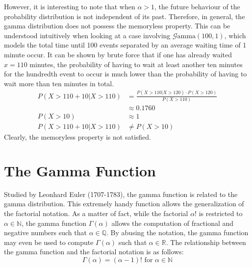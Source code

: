 \documentclass[12pt]{article}
\newcommand{\G}{\mathcal{G}}
\begin{document}
However, it is interesting to note that when $\alpha>1$, the future behaviour of the probability distribution is not
independent of its past. Therefore, in general, the gamma distribution does not possess the memoryless property. This
can be understood intuitively when looking at a case involving $\G\text{amma}(100, 1)$, which models the total time
until 100 events separated by an average waiting time of 1 minute occur. It can be shown by brute force that if one has
already waited $x=110$ minutes, the probability of having to wait at least another ten minutes for the hundredth event
to occur is much lower than the probability of having to wait more than ten minutes in total\cite{myersCS547Lecture,
probabilitycourseExponentialDistribution}.
\begin{equation}
	\begin{split}
		P(X>110+10 | X>110)	&=			\frac{P(X>110 | X>120)\cdot P(X>120)}{P(X>110)}\\
							&\approx	0.1760\\
		P(X>10)				&\approx	1\\
		P(X>110+10 | X>110)	&\neq		P(X>10)
	\end{split}
\end{equation}
Clearly, the memoryless property is not satisfied.


\pagebreak
\section{The Gamma Function}
\vspace*{-6pt}
Studied by Leonhard Euler (1707-1783), the gamma function is related to the gamma distribution. This extremely handy
function allows the generalization of the factorial notation. As a matter of fact, while the factorial $\alpha!$ is
restricted to $\alpha\in\mathbb{N}$, the gamma function $\Gamma(\alpha)$ allows the computation of fractional and
negative numbers such that $\alpha\in\mathbb{Q}$. By abusing the notation, the gamma function may even be used to
compute $\Gamma(\alpha)$ such that $\alpha\in\mathbb{R}$. The relationship between the gamma function and the factorial
notation is as follows:
\vspace*{-18pt}
\begin{equation}\label{eq:gammafunction:factorial}
	\Gamma(\alpha)=(\alpha-1)!\text{ for }\alpha\in\mathbb{N}
\end{equation}
\vspace*{-60pt}
\end{document}
